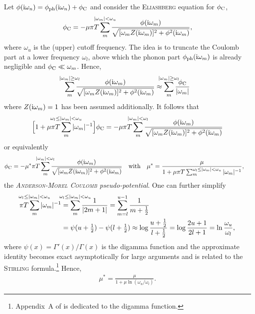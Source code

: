 Let $\phi(\mathrm i \omega_n) = \phi \sb{\text{ph}} (\mathrm i \omega_n) + \phi \sb{\text{C}}$ and consider
the \textsc{Eliashberg} equation for $\phi \sb{\text{C}}$,
%
\begin{align*}
	\phi \sub C = -\mu \pi T \sum_m^{\mathclap{|\omega_m| < \omega_u}}
    \frac
        {\phi(\I \omega_m)}
        {\sqrt{[\omega_m Z(\I \omega_m)]^2 + \phi^2(\I \omega_m)}},
\end{align*}
%
where $\omega_u$ is the (upper) cutoff frequency. The idea is to truncate the
Coulomb part at a lower frequency $\omega_l$, above which the phonon part $\phi
\sb{\text{ph}} (\mathrm i \omega_m)$ is already negligible and $\phi \sb{\text{C}} \ll \omega_m$.
Hence,
%
\begin{align*}
	\sum_m^{\mathclap{|\omega_m| \geq \omega_l}}
    \frac
        {\phi(\I \omega_m)}
        {\sqrt{[\omega_m Z(\I \omega_m)]^2 + \phi^2(\I \omega_m)}}
    \approx \sum_m^{\mathclap{|\omega_m| \geq \omega_l}}
    \frac{\phi \sub C}{|\omega_m|}
\end{align*}
%
where $Z(\mathrm i \omega_m) = 1$ has been assumed additionally. It follows that
%
\begin{align*}
	\Big[
        1 + \mu \pi T \sum_m^{\mathclap{\omega_l \leq |\omega_m| < \omega_u}}
        |\omega_m|^{-1}
    \Big]
    \phi \sub C = -\mu \pi T \sum_m^{\mathclap{|\omega_m| < \omega_l}}
    \frac
        {\phi(\I \omega_m)}
        {\sqrt{[\omega_m Z(\I \omega_m)]^2 + \phi^2(\I \omega_m)}}
\end{align*}
%
or equivalently
%
\begin{align*}
	\phi \sub C = -\mu^* \pi T \sum_m^{\mathclap{|\omega_m| < \omega_l}}
    \frac
        {\phi(\I \omega_m)}
        {\sqrt{[\omega_m Z(\I \omega_m)]^2 + \phi^2(\I \omega_m)}}
    \quad \text{with} \quad
    \mu^* &= \frac \mu {1 + \mu \pi T
    \sum_m^{\omega_l \leq |\omega_m| < \omega_u} |\omega_m|^{-1}},
\end{align*}
%
the \emph{\textsc{Anderson-Morel} \textsc{Coulomb} pseudo-potential}. One can
further simplify
%
\begin{align*}
	\pi T \sum_m^{\mathclap{\omega_l \leq |\omega_m| < \omega_u}}
    |\omega_m|^{-1}
    &= \sum_m^{\mathclap{\omega_l \leq |\omega_m| < \omega_u}}
    \frac 1 {|2 m + 1|}
    = \sum_{m = l}^{u - 1} \frac 1 {m + \frac 1 2} \\
	&= \psi(u + \tfrac 1 2) - \psi(l + \tfrac 1 2)
    \approx \log \frac{u + \frac 1 2}{l + \frac 1 2}
    = \log \frac{2 u + 1}{2 l + 1} = \ln \frac{\omega_u}{\omega_l},
\end{align*}
%
where $\psi(x) = \varGamma'(x) / \varGamma(x)$ is the digamma function and the
approximate identity becomes exact asymptotically for large arguments and is
related to the \textsc{Stirling} formula.\footnote{Appendix~A of
\cite{AllenMitrovic82} is dedicated to the digamma function.} Hence,
%
\begin{align*}
	\mu^* = \frac \mu {1 + \mu \ln(\omega_u / \omega_l)}.
\end{align*}

